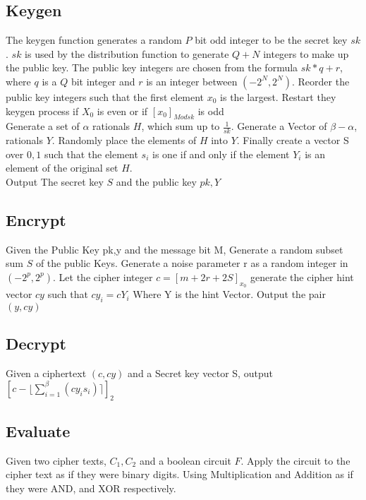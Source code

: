 \documentclass[letterpaper,11pt]{article} %
\begin{document}
\subsection*{Keygen}
The keygen function generates a random $P$ bit odd integer to be the secret key $sk$. $sk$ is used by the distribution function to generate $Q + N$ integers to make up the public key. The public key integers are chosen from
the formula $sk * q + r$, where $q$ is a $Q$ bit integer and $r$ is an integer between $(-2^N, 2^N).$ Reorder the public key integers such that the first element $x_0$ is the largest. Restart they keygen process if $X_0$ is even or if $[x_0]_{Mod sk}$ is odd  \\

Generate a set of $\alpha$ rationals $H$, which sum up to $\frac{1}{sk}$. Generate a Vector of $\beta - \alpha$, rationals $Y.$ Randomly place the elements of $H$ into $Y$. Finally create a vector S over $0,1$ such that the element $s_i$ is one if and only if the element $Y_i$ is an element of the original set $H$.\\

Output The secret key $S$ and the public key $pk,Y$

\subsection*{Encrypt}
Given the Public Key pk,y and the message bit M, Generate a random subset sum $S$ of the public Keys. Generate a noise parameter r as a random integer in $(-2^p,2^p)$. Let the cipher integer $c=[m+2r+2S]_{x_0}$ generate the cipher hint vector $cy$ such that $cy_i=cY_i$
Where Y is the hint Vector. Output the pair $(y,cy)$

\subsection*{Decrypt}
	Given a ciphertext $(c,cy)$ and a Secret key vector S, output $[c-\lfloor \sum\limits_{i=1}^\beta (cy_is_i) \rceil ]_2$
\subsection*{Evaluate}
Given two cipher texts, $C_1, C_2$ and a boolean circuit $F$. Apply the circuit to the cipher text as if they were binary digits. Using Multiplication and Addition as if they were AND, and XOR respectively. 
\end{document}
